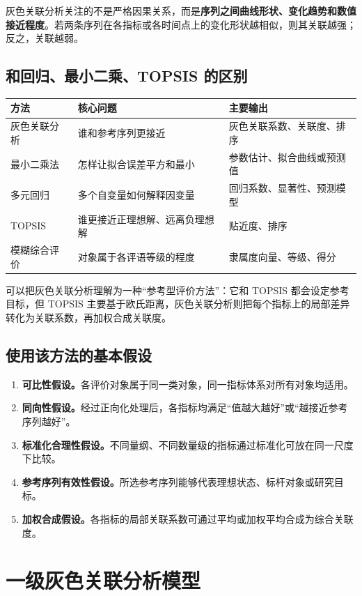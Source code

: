 \documentclass[UTF8,a4paper,11pt]{ctexart}
\begin{document}
灰色关联分析关注的不是严格因果关系，而是\textbf{序列之间曲线形状、变化趋势和数值接近程度}。若两条序列在各指标或各时间点上的变化形状越相似，则其关联越强；反之，关联越弱。

\subsection{和回归、最小二乘、TOPSIS 的区别}
\begin{longtable}{p{3cm}p{4cm}p{6cm}}
\toprule
方法 & 核心问题 & 主要输出 \\
\midrule
灰色关联分析 & 谁和参考序列更接近 & 灰色关联系数、关联度、排序 \\
最小二乘法 & 怎样让拟合误差平方和最小 & 参数估计、拟合曲线或预测值 \\
多元回归 & 多个自变量如何解释因变量 & 回归系数、显著性、预测模型 \\
TOPSIS & 谁更接近正理想解、远离负理想解 & 贴近度、排序 \\
模糊综合评价 & 对象属于各评语等级的程度 & 隶属度向量、等级、得分 \\
\bottomrule
\end{longtable}

可以把灰色关联分析理解为一种“参考型评价方法”：它和 TOPSIS 都会设定参考目标，但 TOPSIS 主要基于欧氏距离，灰色关联分析则把每个指标上的局部差异转化为关联系数，再加权合成关联度。

\subsection{使用该方法的基本假设}
\begin{enumerate}[label=H\arabic*：]
  \item \textbf{可比性假设。}各评价对象属于同一类对象，同一指标体系对所有对象均适用。
  \item \textbf{同向性假设。}经过正向化处理后，各指标均满足“值越大越好”或“越接近参考序列越好”。
  \item \textbf{标准化合理性假设。}不同量纲、不同数量级的指标通过标准化可放在同一尺度下比较。
  \item \textbf{参考序列有效性假设。}所选参考序列能够代表理想状态、标杆对象或研究目标。
  \item \textbf{加权合成假设。}各指标的局部关联系数可通过平均或加权平均合成为综合关联度。
\end{enumerate}

\section{一级灰色关联分析模型}
\end{document}

